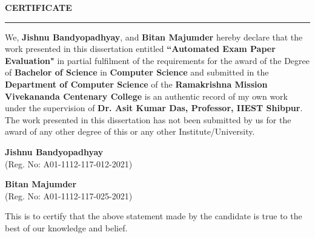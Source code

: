 \begin{center}
{\bf\Large CERTIFICATE }\\
\noindent\rule{\linewidth}{2pt}
\par\vspace{5mm}
\end{center}
    \noindent We, \textbf{Jishnu Bandyopadhyay}, and \textbf{Bitan Majumder} hereby declare that the work presented in this dissertation entitled \textbf{``Automated Exam Paper Evaluation"} in partial fulfilment of the requirements for the award of the Degree of \textbf{Bachelor of Science} in \textbf{Computer Science} and submitted in the  \textbf{Department of Computer Science} of the \textbf{Ramakrishna Mission Vivekananda Centenary College} is an authentic record of my own work under the supervision of  \textbf{Dr. Asit Kumar Das, Professor, IIEST Shibpur}. The work presented in this dissertation has not been submitted by us for the award of any other degree of this or any other Institute/University.
\vspace{6mm}
\begin{flushright}
	\textbf{Jishnu Bandyopadhyay} \\
	(Reg. No: A01-1112-117-012-2021)
\end{flushright}
\vspace{0.3cm}
\begin{flushright}
	\textbf{Bitan Majumder} \\
	(Reg. No: A01-1112-117-025-2021)
\end{flushright}
\vspace{1mm}
\noindent This is to certify that the above statement made by the candidate is true to the best of our knowledge and belief.
\vspace{10mm}

